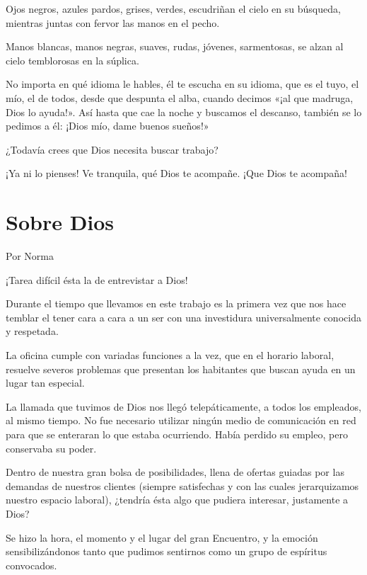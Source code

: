 \documentclass[11pt,twoside,openright,a5paper]{book}
\begin{document}
Ojos negros, azules pardos, grises, verdes, escudriñan el cielo en su búsqueda, mientras juntas con fervor las manos en el pecho.

Manos blancas, manos negras, suaves, rudas, jóvenes, sarmentosas, se alzan al cielo temblorosas en la súplica.

No importa en qué idioma le hables, él te escucha en su idioma, que es el tuyo, el mío, el de todos, desde que despunta el alba, cuando decimos «¡al que madruga, Dios lo ayuda!». Así hasta que cae la noche y buscamos el descanso, también se lo pedimos a él: ¡Dios mío, dame buenos sueños!»

¿Todavía crees que Dios necesita buscar trabajo?

¡Ya ni lo pienses! Ve tranquila, qué Dios te acompañe. ¡Que Dios te acompaña!

\section*{Sobre Dios}

                                                                                                   \begin{flushright}Por Norma\end{flushright}


¡Tarea difícil ésta la de entrevistar a Dios! 

Durante el tiempo que llevamos en este trabajo es la primera vez que nos hace temblar el tener cara a cara a un ser con una investidura universalmente conocida y respetada.

La oficina cumple con variadas funciones a la vez, que en el horario laboral, resuelve severos problemas que presentan los habitantes que buscan ayuda en un lugar tan especial.

La llamada que tuvimos de Dios nos llegó telepáticamente, a todos los empleados, al mismo tiempo. No fue necesario utilizar ningún medio de comunicación en red para que se enteraran lo que estaba ocurriendo. Había perdido su empleo, pero conservaba su poder.

Dentro de nuestra gran bolsa de posibilidades, llena de ofertas guiadas por las demandas de nuestros clientes (siempre satisfechas y con las cuales jerarquizamos nuestro espacio laboral), ¿tendría ésta algo que pudiera interesar, justamente a Dios?

Se hizo la hora, el momento y el lugar del gran Encuentro, y la emoción sensibilizándonos tanto que pudimos sentirnos como un grupo de espíritus convocados.
\end{document}

